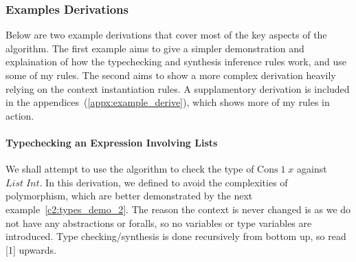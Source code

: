 \subsubsection{Examples Derivations}
Below are two example derivations that cover most of the key aspects of the algorithm. The first example aims to give a simpler demonstration and explaination of how the typechecking and synthesis inference rules work, and use some of my rules. The second aims to show a more complex derivation heavily relying on the context instantiation rules. A supplamentory derivation is included in the appendices~(\ref{appx:example_derive}), which shows more of my rules in action. 

\paragraph{Typechecking an Expression Involving Lists}
\label{c2:types_demo_1}
We shall attempt to use the algorithm to check the type of $\text{Cons}\;1\;x$ against $List\;Int$. In this derivation, we defined  to avoid the complexities of polymorphism, which are better demonstrated by the next example~\ref{c2:types_demo_2}. The reason the context is never changed is as we do not have any abstractions or foralls, so no variables or type variables are introduced. Type checking/synthesis is done recursively from bottom up, so read [1] upwards. 

